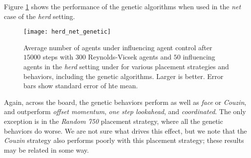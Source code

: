 
Figure \ref{fig:herdnetgenetic} shows the performance of the genetic algorithms
when used in the \textit{net} case of the \textit{herd} setting.
\begin{figure}
    \centering
    \texttt{[image: herd\_net\_genetic]}
    \caption{Average number of agents under influencing agent control after $15000$
    steps with $300$ Reynolds-Vicsek agents and $50$ influencing agents in the
    \textit{herd} setting under for various placement strategies and behaviors,
    including the genetic algorithms.
    Larger is better.
    Error bars show standard error of hte mean.}
    \label{fig:herdnetgenetic}
\end{figure}
Again, across the board, the genetic behaviors perform as well as \textit{face}
or \textit{Couzin}, and outperform \textit{offset momentum}, \textit{one step
lookahead}, and \textit{coordinated}.
The only exception is in the \textit{Random 750} placement strategy, where all
the genetic behaviors do worse.
We are not sure what drives this effect, but we note that the \textit{Couzin}
strategy also performs poorly with this placement strategy; these results may
be related in some way.
